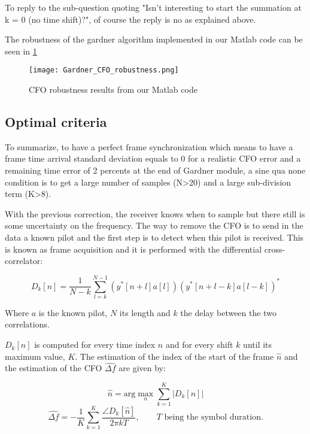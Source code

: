 To reply to the sub-question quoting "Isn’t interesting to start the summation at k = 0 (no time shift)?", of course the reply is no as explained above.

The robustness of the gardner algorithm implemented in our Matlab code can be seen in \ref{fig:Gardner_CFO_robustness}

\begin{figure}[H]
    \centering
    \texttt{[image: Gardner\_CFO\_robustness.png]}
    \caption{CFO robustness results from our Matlab code}
    \label{fig:Gardner_CFO_robustness}
\end{figure}

\subsection{Optimal criteria}

To summarize, to have a perfect frame synchronization which means to have a frame time arrival standard deviation equals to 0 for a realistic CFO
error and a remaining time error of 2 percents at the end of Gardner module, a sine qua none condition is to get a large number of 
samples (N>20) and a large sub-division term (K>8).

With the previous correction, the receiver knows when to sample but there still is some uncertainty on the frequency. The way to remove the CFO is to send in the data a known pilot and the first step is to detect when this pilot is received. This is known as frame acquisition and it is performed with the differential cross-correlator:

\begin{equation*}
    D_k[n] = \frac{1}{N-k} \sum_{l=k}^{N-1} \left(y^*[n+l]a[l]\right) \left(y^*[n+l-k]a[l-k]\right)^*
\end{equation*}

Where $a$ is the known pilot, $N$ its length and $k$ the delay between the two correlations. \par
$D_k[n]$ is computed for every time index $n$ and for every shift $k$ until its maximum value, $K$. The estimation of the index of the start of the frame $\hat{n}$ and the estimation of the CFO $\hat{\Delta f}$ are given by:

\begin{equation*}
    \hat{n} = \text{arg} \max_n \sum_{k=1}^{K} |D_k[n]|
\end{equation*}
\begin{equation*}
    \hat{\Delta f} = -\frac{1}{K} \sum_{k=1}^{K} \frac{\angle D_k[\hat{n}]}{2\pi kT}, \qquad T \text{ being the symbol duration.}
\end{equation*}

